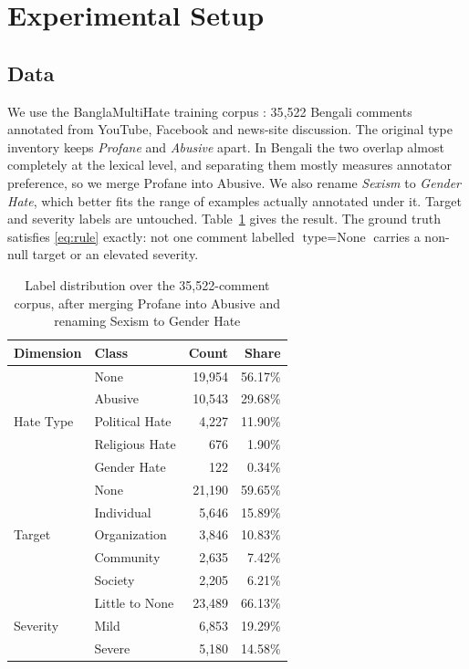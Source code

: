 \documentclass[conference]{IEEEtran}
\begin{document}
\section{Experimental Setup}
\label{sec:exp}

\subsection{Data}
We use the BanglaMultiHate training corpus \cite{hasan2026banglamultihate}: 35{,}522 Bengali comments annotated from YouTube, Facebook and news-site discussion. The original type inventory keeps \emph{Profane} and \emph{Abusive} apart. In Bengali the two overlap almost completely at the lexical level, and separating them mostly measures annotator preference, so we merge Profane into Abusive. We also rename \emph{Sexism} to \emph{Gender Hate}, which better fits the range of examples actually annotated under it. Target and severity labels are untouched. Table~\ref{tab:data} gives the result. The ground truth satisfies \eqref{eq:rule} exactly: not one comment labelled $\text{type}=\text{None}$ carries a non-null target or an elevated severity.

\begin{table}[t]
\caption{Label distribution over the 35{,}522-comment corpus, after merging
Profane into Abusive and renaming Sexism to Gender Hate}
\label{tab:data}
\centering
\footnotesize
\begin{tabular}{llrr}
\toprule
\textbf{Dimension} & \textbf{Class} & \textbf{Count} & \textbf{Share} \\
\midrule
\multirow{5}{*}{Hate Type}
& None            & 19{,}954 & 56.17\% \\
& Abusive         & 10{,}543 & 29.68\% \\
& Political Hate  & 4{,}227  & 11.90\% \\
& Religious Hate  & 676      & 1.90\%  \\
& Gender Hate     & 122      & 0.34\%  \\
\midrule
\multirow{5}{*}{Target}
& None            & 21{,}190 & 59.65\% \\
& Individual      & 5{,}646  & 15.89\% \\
& Organization    & 3{,}846  & 10.83\% \\
& Community       & 2{,}635  & 7.42\%  \\
& Society         & 2{,}205  & 6.21\%  \\
\midrule
\multirow{3}{*}{Severity}
& Little to None  & 23{,}489 & 66.13\% \\
& Mild            & 6{,}853  & 19.29\% \\
& Severe          & 5{,}180  & 14.58\% \\
\bottomrule
\end{tabular}
\end{table}
\end{document}
